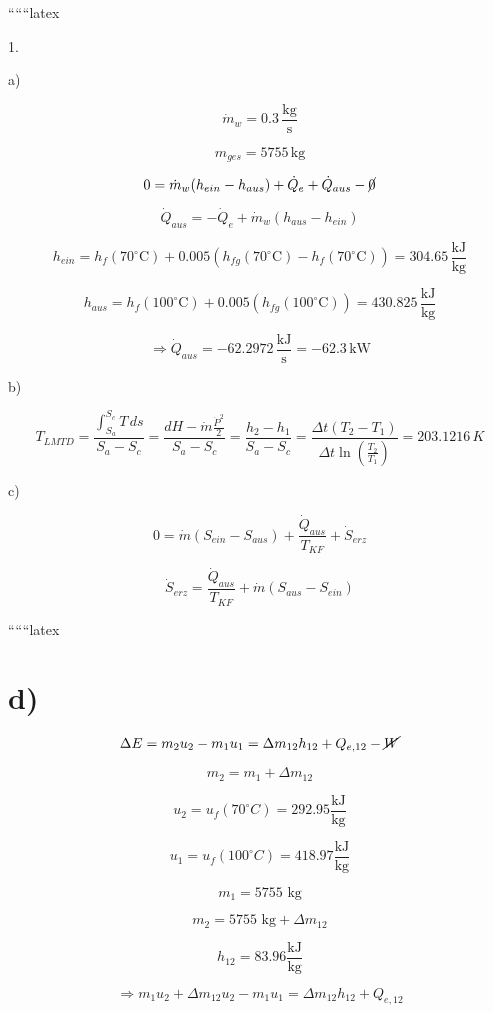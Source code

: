 
``````latex


1. 

a) 

\[
\dot{m}_w = 0.3 \, \frac{\text{kg}}{\text{s}}
\]

\[
m_{ges} = 5755 \, \text{kg}
\]

\[
0 = \dot{m}_w (h_{ein} - h_{aus}) + \dot{Q}_e + \dot{Q}_{aus} - \cancel{0}
\]

\[
\dot{Q}_{aus} = -\dot{Q}_e + \dot{m}_w (h_{aus} - h_{ein})
\]

\[
h_{ein} = h_f (70^\circ \text{C}) + 0.005 \left( h_{fg} (70^\circ \text{C}) - h_f (70^\circ \text{C}) \right) = 304.65 \, \frac{\text{kJ}}{\text{kg}}
\]

\[
h_{aus} = h_f (100^\circ \text{C}) + 0.005 \left( h_{fg} (100^\circ \text{C}) \right) = 430.825 \, \frac{\text{kJ}}{\text{kg}}
\]

\[
\Rightarrow \dot{Q}_{aus} = -62.2972 \, \frac{\text{kJ}}{\text{s}} = -62.3 \, \text{kW}
\]

b) 

\[
T_{LMTD} = \frac{\int_{S_a}^{S_c} T \, ds}{S_a - S_c} = \frac{dH - \dot{m} \frac{\dot{P}^2}{2}}{S_a - S_c} = \frac{h_2 - h_1}{S_a - S_c} = \frac{\Delta t (T_2 - T_1)}{\Delta t \ln \left( \frac{T_2}{T_1} \right)} = 203.1216 \, K
\]

c) 

\[
0 = \dot{m} (S_{ein} - S_{aus}) + \frac{\dot{Q}_{aus}}{T_{KF}} + \dot{S}_{erz}
\]

\[
\dot{S}_{erz} = \frac{\dot{Q}_{aus}}{T_{KF}} + \dot{m} (S_{aus} - S_{ein})
\]

``````latex


\section*{d)}

\[
\Delta E = m_2 u_2 - m_1 u_1 = \Delta m_{12} h_{12} + Q_{e,12} - \cancel{W}
\]

\[
m_2 = m_1 + \Delta m_{12}
\]

\[
u_2 = u_f (70^\circ C) = 292.95 \frac{\text{kJ}}{\text{kg}}
\]

\[
u_1 = u_f (100^\circ C) = 418.97 \frac{\text{kJ}}{\text{kg}}
\]

\[
m_1 = 5755 \text{ kg}
\]

\[
m_2 = 5755 \text{ kg} + \Delta m_{12}
\]

\[
h_{12} = 83.96 \frac{\text{kJ}}{\text{kg}}
\]

\[
\Rightarrow m_1 u_2 + \Delta m_{12} u_2 - m_1 u_1 = \Delta m_{12} h_{12} + Q_{e,12}
\]

